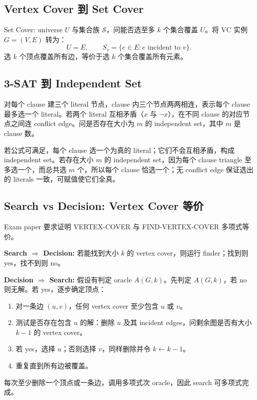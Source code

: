 \documentclass[UTF8,a4paper,11pt]{ctexart}
\begin{document}
\subsection{Vertex Cover 到 Set Cover}

Set Cover: universe $U$ 与集合族 $\mathcal S$，问能否选至多 $k$ 个集合覆盖 $U$。将 VC 实例 $G=(V,E)$ 转为：
\[
U=E,\qquad S_v=\{e\in E:e\text{ incident to }v\}.
\]
选 $k$ 个顶点覆盖所有边，等价于选 $k$ 个集合覆盖所有元素。

\subsection{3-SAT 到 Independent Set}

对每个 clause 建三个 literal 节点，clause 内三个节点两两相连，表示每个 clause 最多选一个 literal。若两个 literal 互相矛盾（$x$ 与 $\neg x$），在不同 clause 的对应节点之间连 conflict edge。问是否存在大小为 $m$ 的 independent set，其中 $m$ 是 clause 数。

若公式可满足，每个 clause 选一个为真的 literal；它们不会互相矛盾，构成 independent set。若存在大小 $m$ 的 independent set，因为每个 clause triangle 至多选一个，而总共选 $m$ 个，所以每个 clause 恰选一个；无 conflict edge 保证选出的 literals 一致，可赋值使它们全真。

\subsection{Search vs Decision: Vertex Cover 等价}

Exam paper 要求证明 VERTEX-COVER 与 FIND-VERTEX-COVER 多项式等价。

\textbf{Search $\Rightarrow$ Decision:} 若能找到大小 $k$ 的 vertex cover，则运行 finder；找到则 yes，找不到则 no。

\textbf{Decision $\Rightarrow$ Search:} 假设有判定 oracle $A(G,k)$。先判定 $A(G,k)$，若 no 则无解。若 yes，逐步确定顶点：
\begin{enumerate}
  \item 对一条边 $(u,v)$，任何 vertex cover 至少包含 $u$ 或 $v$。
  \item 测试是否存在包含 $u$ 的解：删除 $u$ 及其 incident edges，问剩余图是否有大小 $k-1$ 的 vertex cover。
  \item 若 yes，选择 $u$；否则选择 $v$，同样删除并令 $k\leftarrow k-1$。
  \item 重复直到所有边被覆盖。
\end{enumerate}
每次至少删除一个顶点或一条边，调用多项式次 oracle，因此 search 可多项式完成。
\end{document}
